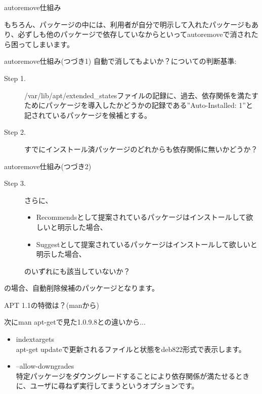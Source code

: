 \begin{frame}{autoremove仕組み}

  もちろん、パッケージの中には、利用者が自分で明示して入れたパッケージもあり、必ずしも他のパッケージで依存していなからといってautoremoveで消されたら困ってしまいます。

\end{frame}

\begin{frame}{autoremove仕組み(つづき1)}
  自動で消してもよいか？についての判断基準:

\begin{description}
 \item [Step 1.] /var/lib/apt/extended\_statesファイルの記録に、過去、依存関係を満たすためにパッケージを導入したかどうかの記録である''Auto-Installed: 1''と記されているパッケージを候補とする。
 \item [Step 2.] すでにインストール済パッケージのどれからも依存関係に無いかどうか？
  \end{description}

\end{frame}

\begin{frame}{autoremove仕組み(つづき2)}

\begin{description}
 \item [Step 3.] さらに、
\begin{itemize}
\item Recommendsとして提案されているパッケージはインストールして欲しいと明示した場合、
\item Suggestとして提案されているパッケージはインストールして欲しいと明示した場合、
\end{itemize}
のいずれにも該当していないか？
  \end{description}

 の場合、自動削除候補のパッケージとなります。

  
\end{frame}


\begin{frame}{APT 1.1の特徴は？(manから)}

  次にman apt-getで見た1.0.9.8との違いから...
 \begin{itemize}
\item indextargets \\
   apt-get updateで更新されるファイルと状態をdeb822形式で表示します。
 \item --allow-downgrades \\
   特定パッケージをダウングレードすることにより依存関係が満たせるときに、ユーザに尋ねず実行してまうというオプションです。
 \end{itemize}
\end{frame}

